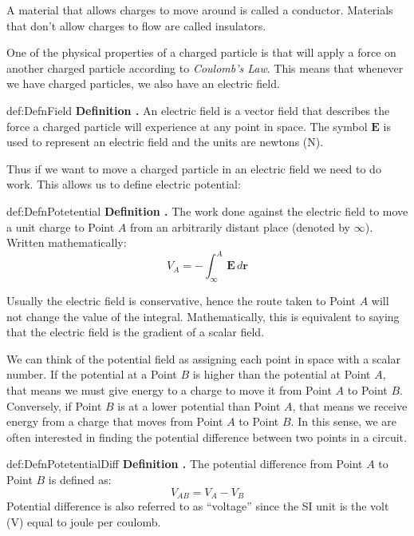 \documentclass[14pt,a5paper,twoside]{book}
\newenvironment{myDefinition}[2]{ \begin{Definition}[adjusted title=#1]{}{#2} 
  \textbf{Definition \thetcbcounter.} \label{#2}}{\end{Definition}}
\begin{document}
A material that allows charges to move around is called a conductor. Materials that don't allow charges to flow are called insulators.

One of the physical properties of a charged particle is that will apply a force on another charged particle according to \emph{Coulomb's Law}. This means that whenever we have charged particles, we also have an electric field.

\begin{myDefinition}{Electric Field}{def:DefnField}
	An electric field is a vector field that describes the force a charged particle will experience at any point in space. The symbol $\mathbf{E}$ is used to represent an electric field and the units are newtons (N).
\end{myDefinition}

Thus if we want to move a charged particle in an electric field we need to do work. This allows us to define electric potential:

\begin{myDefinition}{Electric Potential}{def:DefnPotetential}
	The work done against the electric field to move a unit charge to Point $A$ from an arbitrarily distant place (denoted by $\infty$). Written mathematically:	
	$$V_{A} = - \int_{\infty}^{A} \mathbf{E}\, d\mathbf{r}$$
\end{myDefinition}

Usually the electric field is conservative, hence the route taken to Point $A$ will not change the value of the integral. Mathematically, this is equivalent to saying that the electric field is the gradient of a scalar field.

We can think of the potential field as assigning each point in space with a scalar number. If the potential at a Point $B$ is higher than the potential at Point $A$, that means we must give energy to a charge to move it from Point $A$ to Point $B$. Conversely, if Point $B$ is at a lower potential than Point $A$, that means we receive energy from a charge that moves from Point $A$ to Point $B$. In this sense, we are often interested in finding the potential difference between two points in a circuit. 

\begin{myDefinition}{Potential Difference}{def:DefnPotetentialDiff}
	The potential difference from Point $A$ to Point $B$ is defined as:	
	$$V_{AB} = V_A - V_B$$
	Potential difference is also referred to as ``voltage'' since the SI unit is the volt (V) equal to joule per coulomb.
\end{myDefinition}
\end{document}
